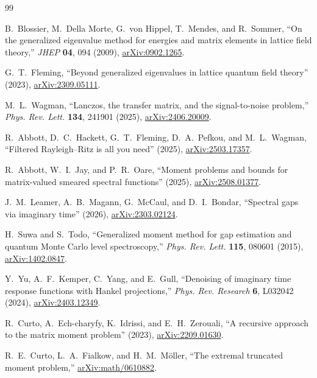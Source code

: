 \documentclass[11pt]{article}
\theoremstyle{definition}
\theoremstyle{remark}
\begin{document}
\begin{thebibliography}{99}

B.~Blossier, M.~Della Morte, G.~von Hippel, T.~Mendes, and R.~Sommer,
``On the generalized eigenvalue method for energies and matrix elements in
lattice field theory,'' \emph{JHEP} \textbf{04}, 094 (2009),
\href{https://arxiv.org/abs/0902.1265}{arXiv:0902.1265}.

G.~T.~Fleming, ``Beyond generalized eigenvalues in lattice quantum field
theory'' (2023),
\href{https://arxiv.org/abs/2309.05111}{arXiv:2309.05111}.

M.~L.~Wagman, ``Lanczos, the transfer matrix, and the signal-to-noise
problem,'' \emph{Phys. Rev. Lett.} \textbf{134}, 241901 (2025),
\href{https://arxiv.org/abs/2406.20009}{arXiv:2406.20009}.

R.~Abbott, D.~C.~Hackett, G.~T.~Fleming, D.~A.~Pefkou, and M.~L.~Wagman,
``Filtered Rayleigh--Ritz is all you need'' (2025),
\href{https://arxiv.org/abs/2503.17357}{arXiv:2503.17357}.

R.~Abbott, W.~I.~Jay, and P.~R.~Oare,
``Moment problems and bounds for matrix-valued smeared spectral functions''
(2025), \href{https://arxiv.org/abs/2508.01377}{arXiv:2508.01377}.

J.~M.~Leamer, A.~B.~Magann, G.~McCaul, and D.~I.~Bondar,
``Spectral gaps via imaginary time'' (2026),
\href{https://arxiv.org/abs/2303.02124}{arXiv:2303.02124}.

H.~Suwa and S.~Todo,
``Generalized moment method for gap estimation and quantum Monte Carlo level
spectroscopy,'' \emph{Phys. Rev. Lett.} \textbf{115}, 080601 (2015),
\href{https://arxiv.org/abs/1402.0847}{arXiv:1402.0847}.

Y.~Yu, A.~F.~Kemper, C.~Yang, and E.~Gull,
``Denoising of imaginary time response functions with Hankel projections,''
\emph{Phys. Rev. Research} \textbf{6}, L032042 (2024),
\href{https://arxiv.org/abs/2403.12349}{arXiv:2403.12349}.

R.~Curto, A.~Ech-charyfy, K.~Idrissi, and E.~H.~Zerouali,
``A recursive approach to the matrix moment problem'' (2023),
\href{https://arxiv.org/abs/2209.01630}{arXiv:2209.01630}.

R.~E.~Curto, L.~A.~Fialkow, and H.~M.~M\"oller,
``The extremal truncated moment problem,''
\href{https://arxiv.org/abs/math/0610882}{arXiv:math/0610882}.


\end{thebibliography}
\end{document}
